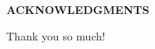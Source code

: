 
%
%

\thispagestyle{empty}

\begin{center}
	{\LARGE\bfseries ACKNOWLEDGMENTS}
\end{center}
\vs\hs Thank you so much!
\thispagestyle{empty}
